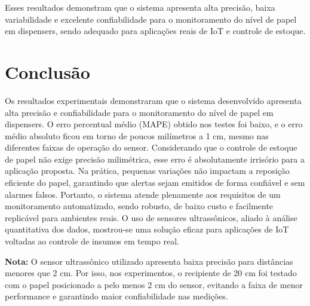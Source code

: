 \documentclass[english,hidelinks]{sbrt}
\begin{document}
Esses resultados demonstram que o sistema apresenta alta precisão, baixa variabilidade e excelente confiabilidade para o monitoramento do nível de papel em dispensers, sendo adequado para aplicações reais de IoT e controle de estoque.

\section{Conclusão}
Os resultados experimentais demonstraram que o sistema desenvolvido apresenta alta precisão e confiabilidade para o monitoramento do nível de papel em dispensers. O erro percentual médio (MAPE) obtido nos testes foi baixo, e o erro médio absoluto ficou em torno de poucos milímetros a 1 cm, mesmo nas diferentes faixas de operação do sensor. Considerando que o controle de estoque de papel não exige precisão milimétrica, esse erro é absolutamente irrisório para a aplicação proposta. Na prática, pequenas variações não impactam a reposição eficiente do papel, garantindo que alertas sejam emitidos de forma confiável e sem alarmes falsos. Portanto, o sistema atende plenamente aos requisitos de um monitoramento automatizado, sendo robusto, de baixo custo e facilmente replicável para ambientes reais. O uso de sensores ultrassônicos, aliado à análise quantitativa dos dados, mostrou-se uma solução eficaz para aplicações de IoT voltadas ao controle de insumos em tempo real.

\textbf{Nota:} O sensor ultrassônico utilizado apresenta baixa precisão para distâncias menores que 2 cm. Por isso, nos experimentos, o recipiente de 20 cm foi testado com o papel posicionado a pelo menos 2 cm do sensor, evitando a faixa de menor performance e garantindo maior confiabilidade nas medições.


\end{document}
